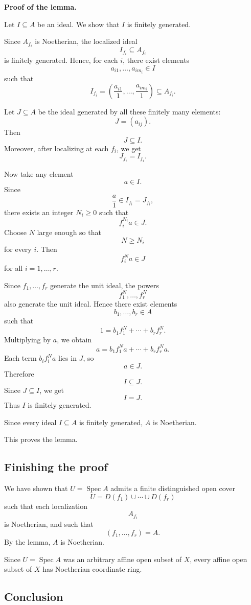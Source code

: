 \documentclass[12pt,a4paper]{article}
\DeclareMathOperator{\Spec}{Spec}
\providecommand{\Spec}{\operatorname{Spec}}
\theoremstyle{notespace}
\begin{document}
\textbf{Proof of the lemma.}

Let \(I\subseteq A\) be an ideal. We show that \(I\) is finitely generated.

Since \(A_{f_i}\) is Noetherian, the localized ideal
\[
I_{f_i}\subseteq A_{f_i}
\]
is finitely generated. Hence, for each \(i\), there exist elements
\[
a_{i1},\dots,a_{im_i}\in I
\]
such that
\[
I_{f_i}
=
\left(
\frac{a_{i1}}{1},
\dots,
\frac{a_{im_i}}{1}
\right)
\subseteq A_{f_i}.
\]

Let \(J\subseteq A\) be the ideal generated by all these finitely many elements:
\[
J=(a_{ij}).
\]
Then
\[
J\subseteq I.
\]
Moreover, after localizing at each \(f_i\), we get
\[
J_{f_i}=I_{f_i}.
\]

Now take any element
\[
a\in I.
\]
Since
\[
\frac{a}{1}\in I_{f_i}=J_{f_i},
\]
there exists an integer \(N_i\geq 0\) such that
\[
f_i^{N_i}a\in J.
\]
Choose \(N\) large enough so that
\[
N\geq N_i
\]
for every \(i\). Then
\[
f_i^N a\in J
\]
for all \(i=1,\dots,r\).

Since \(f_1,\dots,f_r\) generate the unit ideal, the powers
\[
f_1^N,\dots,f_r^N
\]
also generate the unit ideal. Hence there exist elements
\[
b_1,\dots,b_r\in A
\]
such that
\[
1=b_1f_1^N+\cdots+b_rf_r^N.
\]
Multiplying by \(a\), we obtain
\[
a=b_1f_1^Na+\cdots+b_rf_r^Na.
\]
Each term \(b_if_i^Na\) lies in \(J\), so
\[
a\in J.
\]
Therefore
\[
I\subseteq J.
\]
Since \(J\subseteq I\), we get
\[
I=J.
\]
Thus \(I\) is finitely generated.

Since every ideal \(I\subseteq A\) is finitely generated, \(A\) is Noetherian.

This proves the lemma.

\subsection*{Finishing the proof}

We have shown that \(U=\Spec A\) admits a finite distinguished open cover
\[
U=D(f_1)\cup\cdots\cup D(f_r)
\]
such that each localization
\[
A_{f_i}
\]
is Noetherian, and such that
\[
(f_1,\dots,f_r)=A.
\]
By the lemma, \(A\) is Noetherian.

Since \(U=\Spec A\) was an arbitrary affine open subset of \(X\), every affine open subset of \(X\) has Noetherian coordinate ring.

\subsection*{Conclusion}
\end{document}
